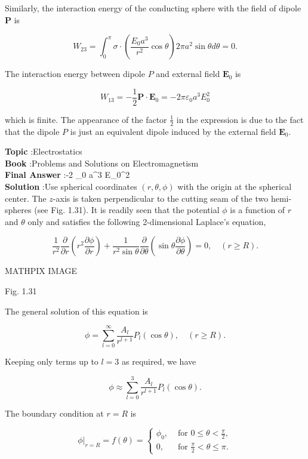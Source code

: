 \documentclass[10pt]{article}
\begin{document}
Similarly, the interaction energy of the conducting sphere with the field of dipole $\mathbf{P}$ is

$$
W_{23}=\int_{0}^{\pi} \sigma \cdot\left(\frac{E_{0} a^{3}}{r^{2}} \cos \theta\right) 2 \pi a^{2} \sin \theta d \theta=0 .
$$

The interaction energy between dipole $P$ and external field $\mathbf{E}_{0}$ is

$$
W_{13}=-\frac{1}{2} \mathbf{P} \cdot \mathbf{E}_{0}=-2 \pi \varepsilon_{0} a^{3} E_{0}^{2}
$$

which is finite. The appearance of the factor $\frac{1}{2}$ in the expression is due to the fact that the dipole $P$ is just an equivalent dipole induced by the external field $\mathbf{E}_{0}$.

\textbf{Topic} :Electrostatics\\
\textbf{Book} :Problems and Solutions on Electromagnetism\\
\textbf{Final Answer} :-2 \pi \varepsilon_{0} a^{3} E_{0}^{2}\\


\textbf{Solution} :Use spherical coordinates $(r, \theta, \phi)$ with the origin at the spherical center. The $z$-axis is taken perpendicular to the cutting seam of the two hemi-spheres (see Fig. 1.31). It is readily seen that the potential $\phi$ is a function of $r$ and $\theta$ only and satisfies the following 2-dimensional Laplace's equation,

$$
\frac{1}{r^{2}} \frac{\partial}{\partial r}\left(r^{2} \frac{\partial \phi}{\partial r}\right)+\frac{1}{r^{2} \sin \theta} \frac{\partial}{\partial \theta}\left(\sin \theta \frac{\partial \phi}{\partial \theta}\right)=0, \quad(r \geq R) .
$$

MATHPIX IMAGE

Fig. 1.31

The general solution of this equation is

$$
\phi=\sum_{l=0}^{\infty} \frac{A_{l}}{r^{l+1}} P_{l}(\cos \theta), \quad(r \geq R) .
$$

Keeping only terms up to $l=3$ as required, we have

$$
\phi \approx \sum_{l=0}^{3} \frac{A_{l}}{r^{l+1}} P_{l}(\cos \theta) .
$$

The boundary condition at $r=R$ is

$$
\left.\phi\right|_{r=R}=f(\theta)= \begin{cases}\phi_{0}, & \text { for } 0 \leq \theta<\frac{\pi}{2}, \\ 0, & \text { for } \frac{\pi}{2}<\theta \leq \pi .\end{cases}
$$
\end{document}
